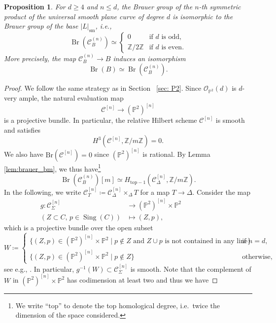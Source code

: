 \documentclass[11pt]{amsart}
\theoremstyle{plain}
\newtheorem{prop}[thm]{Proposition}
\theoremstyle{definition}
\theoremstyle{remark}
\DeclareMathOperator{\Br}{Br}
\DeclareMathOperator{\Sing}{Sing}
\begin{document}
\begin{prop}\label{prop: brauer of symm}
    For $d\geq 4$ and $n\leq d$, the Brauer group of the $n$-th symmetric product of the universal smooth plane curve of degree $d$ is isomorphic to the Brauer group of the base $|L|_{\mathrm{sm}}$, i.e.,
    $$\Br(\mathcal C_B^{(n)}) \simeq \begin{cases}0 & \text{if } d \text{ is odd,} \\
    \mathbb Z / 2 \mathbb Z &\text{if } d \text{ is even.}\end{cases}$$
More precisely, the map $\mathcal C_B^{(n)} \to B$ induces an isomorphism
$$\Br(B) \simeq \Br(\mathcal C_B^{(n)}).$$
\end{prop}
\begin{proof}
We follow the same strategy as in Section ~\ref{sec: P2}.
Since $\mathcal O_{\mathbb P^2}(d)$ is $d$-very ample, the natural evaluation map
$$\mathcal C^{[n]} \to (\mathbb P^2)^{[n]}$$
is a projective bundle. In particular, the relative Hilbert scheme $\mathcal C^{[n]}$ is smooth and satisfies $$H^3(\mathcal C^{[n]}, \mathbb Z / m \mathbb Z) = 0.$$ We also have $\mathrm{Br}(\mathcal{C}^{[n]}) = 0$ since $(\mathbb P^2)^{[n]}$ is rational. By Lemma \ref{lem:brauer_bm}, we thus have\footnote{We write ``$\mathrm{top}$'' to denote the top homological degree, i.e.~twice the dimension of the space considered.}
$$\Br(\mathcal C_B^{(n)})[m] \simeq H_{\mathrm{top}-1}(\mathcal C^{[n]}_{\Delta}, \mathbb Z / m \mathbb Z).$$
In the following, we write $\mathcal{C}^{[n]}_T \coloneq \mathcal{C}^{[n]}_\Delta \times_\Delta T$ for a map $T \to \Delta$.
Consider the map 
\begin{align*}g \colon \mathcal C^{[n]}_\Sigma &\to (\mathbb P^2)^{[n]} \times \mathbb P^2 \qquad \qquad \quad \\
(Z \subset C,\, p \in \Sing(C)) & \mapsto (Z, p),\qquad \qquad \quad 
\end{align*}
which is a projective bundle over the open subset
$$W \coloneqq \begin{cases}
\{(Z, p) \in (\mathbb P^2)^{[n]} \times \mathbb P^2 \mid p \not\in Z \text{ and } Z \cup p \text{ is not contained in any line}\} & \text{if } n = d,\\
\{(Z, p) \in (\mathbb P^2)^{[n]} \times \mathbb P^2 \mid p \not \in Z \} & \text{otherwise,}
\end{cases} $$
see e.g., {\cite[Lemma~2]{computingsym2011}}.
In particular, $g^{-1}(W) \subset \mathcal C^{[n]}_{\Sigma}$ is smooth. Note that the complement of $W$ in $(\mathbb P^2)^{[n]} \times \mathbb P^2$ has codimension at least two and thus we have

\end{proof}
\end{document}
